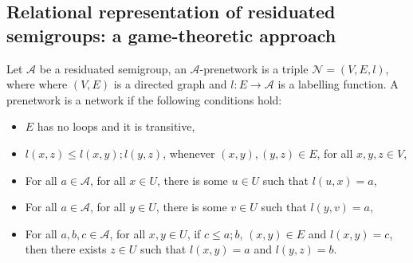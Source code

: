 \documentclass[a4paper]{article}
\theoremstyle{defin}
\theoremstyle{theorem}
\theoremstyle{claim}
\theoremstyle{prop}
\theoremstyle{lemma}
\theoremstyle{fact}
\theoremstyle{ex}
\theoremstyle{col}
\begin{document}
\subsection{Relational representation of residuated semigroups: a game-theoretic approach}

Let $\mathcal{A}$ be a residuated semigroup, an $\mathcal{A}$-prenetwork is a triple $\mathcal{N} = (V, E, l)$, where where $(V, E)$ is a directed graph and $l : E \to \mathcal{A}$ is a labelling function. A prenetwork is a network if
the following conditions hold:
\begin{itemize}
\item $E$ has no loops and it is transitive,
\item $l(x, z) \leq l(x, y) ; l(y,z)$, whenever $(x, y), (y, z) \in E$, for all $x, y, z \in V$,
\item For all $a \in \mathcal{A}$, for all $x \in U$, there is some $u \in U$ such that $l(u, x) = a$,
\item For all $a \in \mathcal{A}$, for all $y \in U$, there is some $v \in U$ such that $l(y, v) = a$,
\item For all $a, b, c \in \mathcal{A}$, for all $x, y \in U$, if $c \leq a ; b$, $(x, y) \in E$ and $l(x, y) = c$, then there exists $z \in U$ such that $l(x,y) = a$ and $l(y, z) = b$.
\end{itemize}
\end{document}

